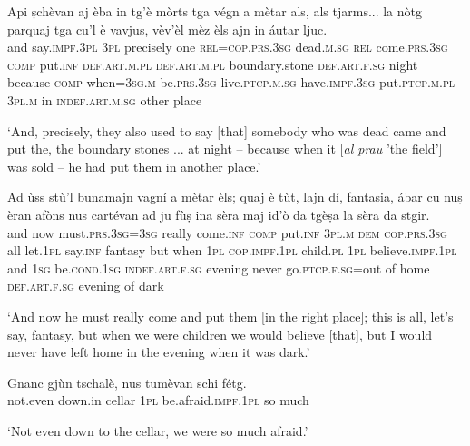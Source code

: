 \begin{linenumbers}
\gll  Api ṣchèvan aj èba in tg’è mòrts tga végn a mètar als, als tjarms... la nòtg parquaj tga cu’l è vavjus, vèv’èl mèz èls ajn in áutar ljuc.  \\
and say.\textsc{impf.3pl} \textsc{3pl} precisely one \textsc{rel=cop.prs.3sg} dead.\textsc{m.sg} \textsc{rel} come.\textsc{prs.3sg} \textsc{comp} put.\textsc{inf} \textsc{def.art.m.pl} \textsc{def.art.m.pl} boundary.stone \textsc{def.art.f.sg} night because \textsc{comp} when=\textsc{3sg.m} be.\textsc{prs.3sg} live.\textsc{ptcp.m.sg} have.\textsc{impf.3sg} put.\textsc{ptcp.m.pl} \textsc{3pl.m} in \textsc{indef.art.m.sg} other place \\
\end{linenumbers}
\medskip
\glt `And, precisely, they also used to say [that] somebody who was dead came and put the, the boundary stones ... at night – because when it [\textit{al prau} 'the field'] was sold – he had put them in another place.'
\medskip

\begin{linenumbers}
\gll Ad ùss stù’l bunamajn vagní a mètar èls; quaj è tùt, lajn dí, fantasia, ábar cu nuṣ èran afòns nus cartévan ad ju fùṣ ina sèra maj id’ò da tgèṣa la sèra da stgir. \\
and now must.\textsc{prs.3sg=3sg} really come.\textsc{inf} \textsc{comp} put.\textsc{inf} \textsc{3pl.m} \textsc{dem} \textsc{cop.prs.3sg} all let.\textsc{1pl} say.\textsc{inf} fantasy but when \textsc{1pl} \textsc{cop.impf.1pl} child.\textsc{pl} \textsc{1pl} believe.\textsc{impf.1pl} and \textsc{1sg} be.\textsc{cond.1sg} \textsc{indef.art.f.sg} evening never go.\textsc{ptcp.f.sg}=out of home \textsc{def.art.f.sg} evening of dark\\
  \end{linenumbers}
\medskip
\glt `And now he must really come and put them [in the right place]; this is all, let’s say, fantasy, but when we were children we would believe [that], but I would never have left home in the evening when it was dark.'
\medskip

\begin{linenumbers}
\gll  Gnanc gjùn tschalè, nus tumèvan schi fétg.  \\
     not.even down.in cellar \textsc{1pl} be.afraid.\textsc{impf.1pl} so much\\
\end{linenumbers}
\medskip
\glt `Not even down to the cellar, we were so much afraid.'
\medskip


